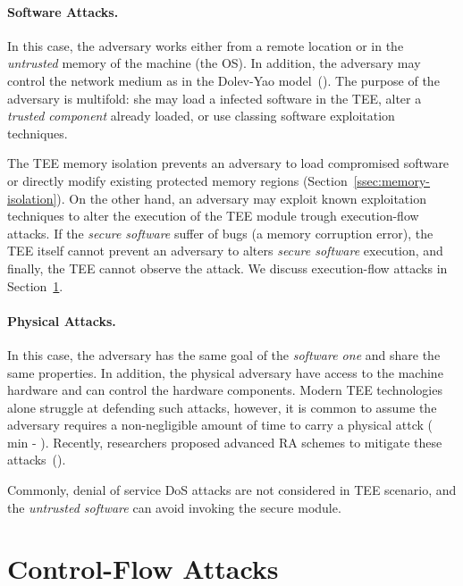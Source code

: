\paragraph{Software Attacks.} 
In this case, the adversary works either from a remote location or in the 
\emph{untrusted} memory of the machine (\eg the OS).
In addition, the adversary may control the network medium as in the Dolev-Yao 
model~(\cite{dolev}).
The purpose of the adversary is multifold: she may load a infected software in 
the TEE, alter a \emph{trusted component} already loaded, or use classing 
software exploitation techniques.

The TEE memory isolation prevents an adversary to load compromised software or 
directly modify existing protected memory regions 
(Section~\ref{ssec:memory-isolation}).
On the other hand, an adversary may exploit known exploitation techniques to 
alter the execution of the TEE module trough execution-flow attacks.
If the \emph{secure software} suffer of bugs (\eg a memory corruption error), 
the TEE itself cannot prevent an adversary to alters \emph{secure software} 
execution, and finally, the TEE cannot observe the attack.
We discuss execution-flow attacks in Section~\ref{sec:control-flow-attacks}.

\paragraph{Physical Attacks.}
In this case, the adversary has the same goal of the \emph{software 
one} and share the same properties. In addition, the physical adversary have 
access to the machine hardware and can control the hardware components.
Modern TEE technologies alone struggle at defending such attacks, however, it 
is common to assume the adversary requires a non-negligible amount of time to 
carry a physical attck ( min - 
\cite{conti2010smallville,conti2008emergent,darpa,ibrahim2017seed,pasta,us-aid}).
Recently, researchers proposed advanced RA schemes to mitigate these 
attacks~(\cite{darpa,visintin2019safe,pasta}).

Commonly, denial of service DoS attacks are not considered in TEE scenario, and 
the \emph{untrusted software} can avoid invoking the secure module.

\section{Control-Flow Attacks}
\label{sec:control-flow-attacks}

